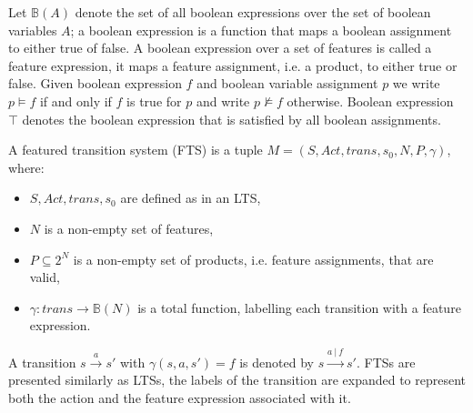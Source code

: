 Let $\mathbb{B}(A)$ denote the set of all boolean expressions over the set of boolean variables $A$; a boolean expression is a function that maps a boolean assignment to either true of false. A boolean expression over a set of features is called a feature expression, it maps a feature assignment, i.e. a product, to either true or false. Given boolean expression $f$ and boolean variable assignment $p$ we write $p \models f$ if and only if $f$ is true for $p$ and write $p \not\models f$ otherwise. Boolean expression $\top$ denotes the boolean expression that is satisfied by all boolean assignments.
\begin{definition}
	\label{def_fts} A featured transition system (FTS) is a tuple $M = (S, Act, trans, s_0, N, P, \gamma)$, where:
	\begin{itemize}
		\item $S, Act, trans, s_0$ are defined as in an LTS,
		\item $N$ is a non-empty set of features,
		\item $P \subseteq 2^N$ is a non-empty set of products, i.e. feature assignments, that are valid,
		\item $\gamma : trans \rightarrow \mathbb{B}(N)$ is a total function, labelling each transition with a feature expression.
	\end{itemize}
\end{definition}
A transition $s \xrightarrow a s'$ with $\gamma(s,a,s') = f$ is denoted by $s \xrightarrow {a\ |\ f} s'$. FTSs are presented similarly as LTSs, the labels of the transition are expanded to represent both the action and the feature expression associated with it.

